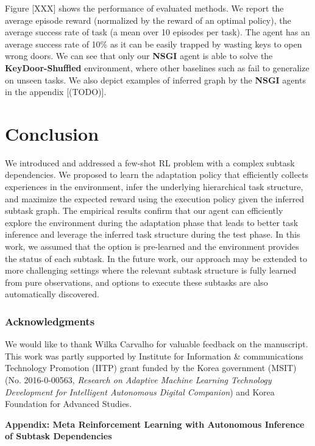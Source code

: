 \documentclass{article} \usepackage{iclr2020_conference,times}
\newcommand{\memo}[1]{{\color{red}[#1]}}
\newcommand{\tb}{\textbf}
\begin{document}
Figure \memo{XXX} shows the performance of evaluated methods.
We report the average episode reward (normalized by the reward of an optimal policy),
the average success rate of task (a mean over 10 episodes per task).
The \Random agent has an average success rate of 10\% as it can be easily trapped by wasting keys to open wrong doors.
We can see that only our \tb{NSGI} agent is able to solve the \tb{KeyDoor-Shuffled} environment,
where other baselines such as \HRL fail to generalize on unseen tasks.
We also depict examples of inferred graph by the \tb{NSGI} agents in the appendix \memo{(TODO)}.
\fi

 \section{Conclusion}\label{sec:conclusion}

We introduced and addressed a few-shot RL problem with a complex subtask dependencies.
We proposed to learn the adaptation policy that efficiently collects experiences in the environment,
infer the underlying hierarchical task structure,
and maximize the expected reward using the execution policy given the inferred subtask graph.
The empirical results confirm that our agent can efficiently explore the environment during the adaptation phase that leads to better task inference
and leverage the inferred task structure during the test phase.
In this work, we assumed that the option is pre-learned and the environment provides the status of each subtask.
In the future work, our approach may be extended to more challenging settings
where the relevant subtask structure is fully learned from pure observations,
and options to execute these subtasks are also automatically discovered.
 
\subsubsection*{Acknowledgments}
We would like to thank Wilka Carvalho for valuable feedback on the manuscript.
This work was partly supported by Institute for Information \& communications Technology Promotion (IITP) grant funded by the Korea government (MSIT) (No. 2016-0-00563, \textit{Research on Adaptive Machine Learning Technology Development for Intelligent Autonomous Digital Companion}) and Korea Foundation for Advanced Studies.




\clearpage
\appendix
\begin{center}
{\Large \textbf{ Appendix: Meta Reinforcement Learning with Autonomous Inference of Subtask Dependencies
\\[10pt]
}}
\end{center}
\end{document}
